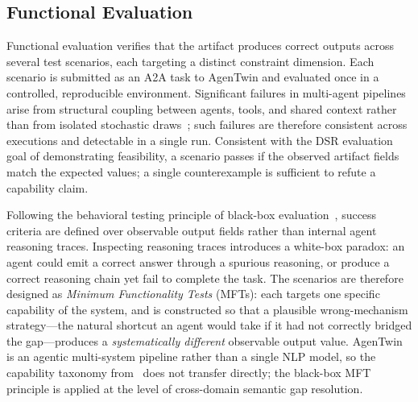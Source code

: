 \subsection{Functional Evaluation}
\label{subsec:functional-evaluation}

Functional evaluation verifies that the artifact produces correct outputs
    across several test scenarios, each targeting a distinct constraint dimension.
Each scenario is submitted as an A2A task to AgenTwin and evaluated once
    in a controlled, reproducible environment.
Significant failures in multi-agent pipelines arise from structural coupling between
    agents, tools, and shared context rather than from isolated stochastic draws~\cite{wegener2026};
    such failures are therefore consistent across executions and detectable in a single run.
Consistent with the DSR evaluation goal of demonstrating feasibility,
    a scenario passes if the observed artifact fields match the expected values;
    a single counterexample is sufficient to refute a capability claim.

Following the behavioral testing principle of black-box evaluation~\cite{ribeiro2020},
    success criteria are defined over observable output fields
    rather than internal agent reasoning traces.
Inspecting reasoning traces introduces a white-box paradox:
    an agent could emit a correct answer through a spurious reasoning,
    or produce a correct reasoning chain yet fail to complete the task.
The scenarios are therefore designed as \emph{Minimum Functionality Tests} (MFTs):
    each targets one specific capability of the system,
    and is constructed so that a plausible wrong-mechanism strategy---the natural shortcut
    an agent would take if it had not correctly bridged the gap---produces
    a \emph{systematically different} observable output value.
AgenTwin is an agentic multi-system pipeline rather than a single NLP model,
    so the capability taxonomy from~\cite{ribeiro2020} does not transfer directly;
    the black-box MFT principle is applied at the level of cross-domain semantic gap resolution.

